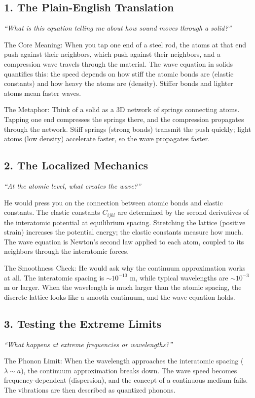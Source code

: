 \documentclass[11pt,openright]{book}
\begin{document}
\subsection*{1. The Plain-English Translation}
\textit{``What is this equation telling me about how sound moves through a solid?''}

The Core Meaning: When you tap one end of a steel rod, the atoms at that end push against their neighbors, which push against their neighbors, and a compression wave travels through the material. The wave equation in solids quantifies this: the speed depends on how stiff the atomic bonds are (elastic constants) and how heavy the atoms are (density). Stiffer bonds and lighter atoms mean faster waves.

The Metaphor: Think of a solid as a 3D network of springs connecting atoms. Tapping one end compresses the springs there, and the compression propagates through the network. Stiff springs (strong bonds) transmit the push quickly; light atoms (low density) accelerate faster, so the wave propagates faster.

\subsection*{2. The Localized Mechanics}
\textit{``At the atomic level, what creates the wave?''}

He would press you on the connection between atomic bonds and elastic constants. The elastic constants $C_{ijkl}$ are determined by the second derivatives of the interatomic potential at equilibrium spacing. Stretching the lattice (positive strain) increases the potential energy; the elastic constants measure how much. The wave equation is Newton's second law applied to each atom, coupled to its neighbors through the interatomic forces.

The Smoothness Check: He would ask why the continuum approximation works at all. The interatomic spacing is $\sim 10^{-10}$ m, while typical wavelengths are $\sim 10^{-3}$ m or larger. When the wavelength is much larger than the atomic spacing, the discrete lattice looks like a smooth continuum, and the wave equation holds.

\subsection*{3. Testing the Extreme Limits}
\textit{``What happens at extreme frequencies or wavelengths?''}

The Phonon Limit: When the wavelength approaches the interatomic spacing ($\lambda \sim a$), the continuum approximation breaks down. The wave speed becomes frequency-dependent (dispersion), and the concept of a continuous medium fails. The vibrations are then described as quantized phonons.
\end{document}
